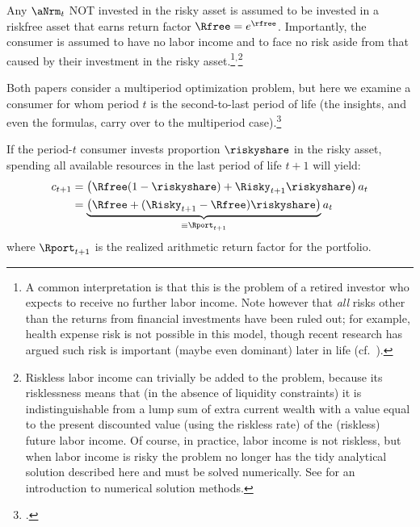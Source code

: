 Any $\aNrm_{t}$ NOT invested in the risky asset is assumed to be invested in a riskfree asset that earns return factor
  $\Rfree=e^{\rfree}$.  Importantly, the consumer is assumed to have
  no labor income and to face no risk aside from that caused by their investment in
  the risky asset.\footnote{A common interpretation is that this is
    the problem of a retired investor who expects to receive no
    further labor income.  Note however that {\it all} risks other
    than the returns from financial investments have been ruled out;
    for example, health expense risk is not possible in this model,
    though recent research has argued such risk is important (maybe even dominant) later in
    life (cf.\ \cite{aclvJoy}).}$^{,}$\footnote{Riskless labor income can trivially be added
    to the problem, because its risklessness means that (in the
    absence of liquidity constraints) it is indistinguishable from a
    lump sum of extra current wealth with a value equal to the present
    discounted value (using the riskless rate) of the (riskless)
    future labor income.  Of course, in practice, labor income is not
    riskless, but when labor income is risky the problem no longer has
    the tidy analytical solution described here and must be solved
    numerically.  See \cite{SolvingMicroDSOPs} for an introduction to
    numerical solution methods.}

Both papers consider a multiperiod optimization problem, but here we
examine a consumer for whom period $t$ is the
second-to-last period of life (the insights, and even the formulas,
carry over to the multiperiod case).\footnote{\cite{samuelson1979we}.}

If the period-$t$ consumer invests proportion $\riskyshare$ in the risky asset,
spending all available resources in the last period of life $t+1$ will yield:
\begin{equation}\begin{gathered}\begin{aligned}
        c_{t+1} & =  \left(\Rfree(1-\riskyshare)+\Risky_{t+1}\riskyshare\right)a_{t} \notag
\\ & =  \underbrace{\left(\Rfree+(\Risky_{t+1}-\Rfree)\riskyshare\right)}_{\equiv \Rport_{t+1}}a_{t} \label{eq:RportDef}
\end{aligned}\end{gathered}\end{equation}
where $\Rport_{t+1}$ is the realized arithmetic %
return factor for the portfolio.

